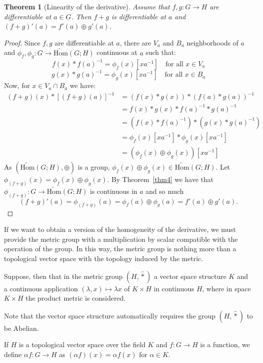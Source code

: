 \documentclass{article}
\newtheorem{theorem}{Theorem}[section]
\numberwithin{theorem}{section}
\numberwithin{equation}{section}
\begin{document}
\begin{theorem}[Linearity of the derivative]\label{thm7}
Assume that $f, g : G \to H$ are differentiable at $a \in G$. Then $f + g$ is differentiable at $a$ and $(f + g)'(a) = f'(a) \oplus g'(a)$.
\end{theorem}
\begin{proof}
Since $f, g$ are differentiable at $a$, there are $V_a$ and $B_a$ neighborhoods of $a$ and $\phi_f, \phi_g : G \to \tilde{\mathrm{Hom}}(G; H)$ continuous at $a$ such that:
\[
f(x) \ast f(a)^{-1} = \phi_f(x)[x a^{-1}] \quad \text{for all } x \in V_a
\]
\[
g(x) \ast g(a)^{-1} = \phi_g(x)[x a^{-1}] \quad \text{for all } x \in B_a
\]
Now, for $x \in V_a \cap B_a$ we have:
\begin{align*}
(f + g)(x) \ast [(f + g)(a)]^{-1} &= (f(x) \ast g(x)) \ast (f(a) \ast g(a))^{-1}\\
&= f(x) \ast g(x) \ast f(a)^{-1} \ast g(a)^{-1}\\
&= (f(x) \ast f(a)^{-1}) \ast (g(x) \ast g(a)^{-1})\\
&= \phi_f(x)[x a^{-1}] \ast \phi_g(x)[x a^{-1}]\\
&= (\phi_f(x) \oplus \phi_g(x))[x a^{-1}]
\end{align*}
As $(\tilde{\mathrm{Hom}}(G; H), \oplus)$ is a group, $\phi_f(x) \oplus \phi_g(x) \in \tilde{\mathrm{Hom}}(G; H)$. Let $\phi_{(f+g)}(x) = \phi_f(x) \oplus \phi_g(x)$. By Theorem~\ref{thm4} we have that $\phi_{(f+g)} : G \to \tilde{\mathrm{Hom}}(G; H)$ is continuous in $a$ and so much
\[
(f + g)'(a) = \phi_{(f+g)}(a) = \phi_f(a) \oplus \phi_g(a) = f'(a) \oplus g'(a).
\]
\end{proof}

If we want to obtain a version of the homogeneity of the derivative, we must provide the metric group with a multiplication by scalar compatible with the operation of the group. In this way, the metric group is nothing more than a topological vector space with the topology induced by the metric.

Suppose, then that in the metric group $(H, \hat{\ast})$ a vector space structure $K$ and a continuous application $(\lambda, x) \mapsto \lambda x$ of $K \times H$ in continuous $H$, where in space $K \times H$ the product metric is considered.

Note that the vector space structure automatically requires the group $(H, \hat{\ast})$ to be Abelian.

If $H$ is a topological vector space over the field $K$ and $f : G \to H$ is a function, we define $\alpha f : G \to H$ as $(\alpha f)(x) = \alpha f(x)$ for $\alpha \in K$.
\end{document}
